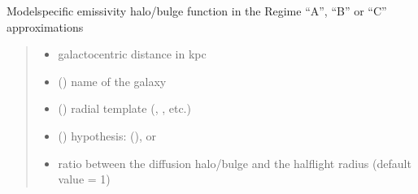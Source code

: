 \documentclass[letterpaper,10pt,english]{sphinxmanual}
\begin{document}

\begin{fulllineitems}
\label{\detokenize{diffsph.profiles:diffsph.profiles.massmodels.Hem}}
\pysigstartsignatures
{}
\pysigstopsignatures
\sphinxAtStartPar
Model\sphinxhyphen{}specific emissivity halo/bulge function in the Regime “A”, “B” or “C” approximations
\begin{quote}\begin{description}
\begin{itemize}
\item {} 
\sphinxAtStartPar
{} \textendash{} galactocentric distance in kpc

\item {} 
\sphinxAtStartPar
{} () \textendash{} name of the galaxy

\item {} 
\sphinxAtStartPar
{} () \textendash{} radial template (, , etc.)

\item {} 
\sphinxAtStartPar
{} () \textendash{} hypothesis:  (),  or 

\item {} 
\sphinxAtStartPar
{} \textendash{} ratio between the diffusion halo/bulge and the half\sphinxhyphen{}light radius (default value = 1)


\end{itemize}
\end{description}
\end{quote}
\end{fulllineitems}
\end{document}
